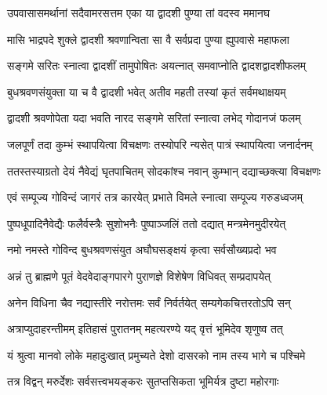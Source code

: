 \hyperref[sec:ekadashi_mahatmyam_padma_puranam]{\closesub}


\label{sec:padma-shravana-dvadashi}

\ganapatyadiDhyanam

\padmaPuranam



\twolineshloka
{उपवासासमर्थानां सदैवामरसत्तम}
{एका या द्वादशी पुण्या तां वदस्व ममानघ}%


\twolineshloka
{मासि भाद्रपदे शुक्ले द्वादशी श्रवणान्विता}
{सा वै सर्वप्रदा पुण्या ह्युपवासे महाफला}%

\twolineshloka
{सङ्गमे सरितः स्नात्वा द्वादशीं तामुपोषितः}
{अयत्नात् समवाप्नोति द्वादशद्वादशीफलम्}%

\twolineshloka
{बुधश्रवणसंयुक्ता या च वै द्वादशी भवेत्}
{अतीव महती तस्यां कृतं सर्वमथाक्षयम्}%

\twolineshloka
{द्वादशी श्रवणोपेता यदा भवति नारद}
{सङ्गमे सरितां स्नात्वा लभेद् गोदानजं फलम्}%

\twolineshloka
{जलपूर्णं तदा कुम्भं स्थापयित्वा विचक्षणः}
{तस्योपरि न्यसेत् पात्रं स्थापयित्वा जनार्दनम्}%

\twolineshloka
{ततस्तस्याग्रतो देयं नैवेद्यं घृतपाचितम्}
{सोदकांश्च नवान् कुम्भान् दद्याच्छक्त्या विचक्षणः}%

\twolineshloka
{एवं सम्पूज्य गोविन्दं जागरं तत्र कारयेत्}
{प्रभाते विमले स्नात्वा सम्पूज्य गरुडध्वजम्}%

\twolineshloka
{पुष्पधूपादिनैवेद्यैः फलैर्वस्त्रैः सुशोभनैः}
{पुष्पाञ्जलिं ततो दद्यात् मन्त्रमेनमुदीरयेत्}%

\twolineshloka
{नमो नमस्ते गोविन्द बुधश्रवणसंयुत}
{अघौघसङ्क्षयं कृत्वा सर्वसौख्यप्रदो भव}%

\twolineshloka
{अन्नं तु ब्राह्मणे पूतं वेदवेदाङ्गपारगे}
{पुराणज्ञे विशेषेण विधिवत् सम्प्रदापयेत्}%

\twolineshloka
{अनेन विधिना चैव नद्यास्तीरे नरोत्तमः}
{सर्वं निर्वर्तयेत् सम्यगेकचित्तरतोऽपि सन्}%

\twolineshloka
{अत्राप्युदाहरन्तीमम् इतिहासं पुरातनम्}
{महत्यरण्ये यद् वृत्तं भूमिदेव शृणुष्व तत्}%

\twolineshloka
{यं श्रुत्वा मानवो लोके महादुःखात् प्रमुच्यते}
{देशो दासरको नाम तस्य भागे च पश्चिमे}%

\twolineshloka
{तत्र विद्वन् मरुर्देशः सर्वसत्त्वभयङ्करः}
{सुतप्तसिकता भूमिर्यत्र दुष्टा महोरगाः}%

